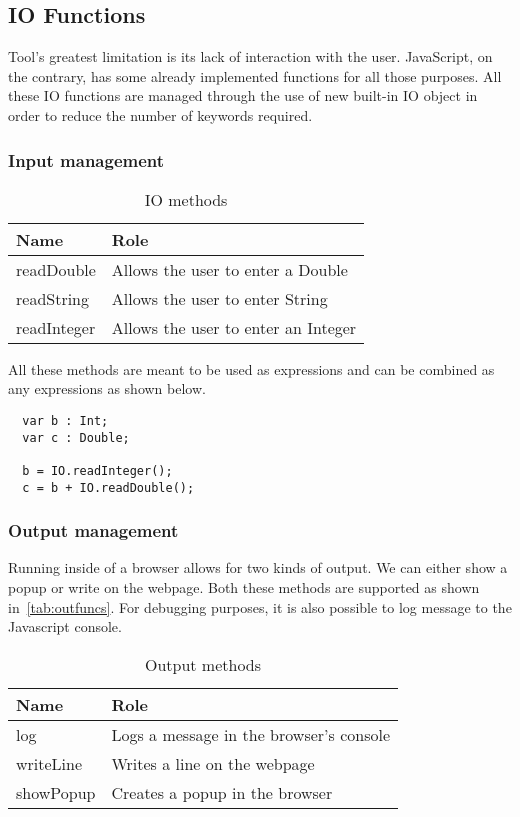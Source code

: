 \subsection{IO Functions}
Tool's greatest limitation is its lack of interaction with the
user. JavaScript, on the  contrary, has some already implemented
functions for all those purposes. All these IO functions are managed
through the use of new built-in IO object in order to reduce the
number of keywords required.

\subsubsection{Input management}

\begin{table}[h!]
  \centering
  \begin{tabular}{ll}
    \toprule
    Name & Role \\
    \midrule
    readDouble & Allows the user to enter a Double \\
    readString & Allows the user to enter String \\
    readInteger & Allows the user to enter an Integer \\
  \end{tabular}
  \caption{IO methods}
  \label{tab:infuncs}
\end{table}

All these methods are meant to be used as expressions and can be
combined as any expressions as shown below.

\begin{lstlisting}
  var b : Int;
  var c : Double;

  b = IO.readInteger();
  c = b + IO.readDouble();
\end{lstlisting}

\subsubsection{Output management}

Running inside of a browser allows for two kinds of output. We can
either show a popup or write on the webpage. Both these methods are
supported as shown in~\autoref{tab:outfuncs}. For debugging purposes,
it is also possible to log message to the Javascript console.

\begin{table}[h!]
  \centering
  \begin{tabular}{ll}
    \toprule
    Name & Role \\
    \midrule
    log & Logs a message in the browser's console \\
    writeLine & Writes a line on the webpage \\
    showPopup & Creates a popup in the browser \\
  \end{tabular}
  \caption{Output methods}
  \label{tab:outfuncs}
\end{table}

